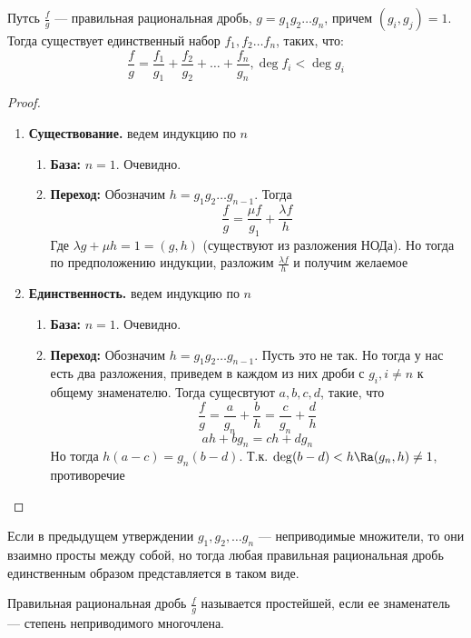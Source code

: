 \begin{theorem}
    Путсь \(\frac{f}{g}\) --- правильная рациональная дробь, \(g = g_1g_2\dots g_n\), причем \((g_i, g_j) = 1\). Тогда существует единственный набор \(f_1, f_2\dots f_n\), таких, что:
    \[\frac{f}{g} = \frac{f_1}{g_1} + \frac{f_2}{g_2} + \dots + \frac{f_n}{g_n}, \deg f_i < \deg g_i\]
\end{theorem}
\begin{proof}\indent
    \begin{enumerate}
        \item[] \textbf{Существование.} ведем индукцию по \(n\)
        \begin{enumerate}
            \item[] \textbf{База:} \(n = 1\). Очевидно.
            \item[] \textbf{Переход:} Обозначим \(h = g_1g_2\dots g_{n-1}\). Тогда 
            \[\frac{f}{g} = \frac{\mu f}{g_1} + \frac{\lambda f}{h}\]
            Где \(\lambda g + \mu h = 1 = (g, h)\) (существуют из разложения НОДа). Но тогда по предположению индукции, разложим \(\frac{\lambda f}{h}\) и получим желаемое
        \end{enumerate}
        \item[] \textbf{Единственность.} ведем индукцию по \(n\)
        \begin{enumerate}
            \item[] \textbf{База:} \(n = 1\). Очевидно.
            \item[] \textbf{Переход:} Обозначим \(h = g_1g_2\dots g_{n-1}\). Пусть это не так. Но тогда у нас есть два разложения, приведем в каждом из них дроби с \(g_i, i \ne n\) к общему знаменателю. Тогда сущесвтуют \(a, b, c, d\), такие, что
            \[\frac{f}{g} = \frac{a}{g_n} + \frac{b}{h} = \frac{c}{g_n} + \frac{d}{h}\]
            \[ah + bg_n = ch + dg_n\]
            Но тогда \(h(a - c) = g_n(b - d)\). Т.к. \(\deg(b - d) < h \Ra (g_n, h) \ne 1 \), противоречие
        \end{enumerate}
    \end{enumerate}
\end{proof}

\begin{note}
    Если в предыдущем утверждении \(g_1, g_2, \dots g_n\) --- неприводимые множители, то они взаимно просты между собой, но тогда любая правильная рациональная дробь единственным образом представляется в таком виде.
\end{note}

\begin{definition}
    Правильная рациональная дробь \(\frac{f}{g}\) называется простейшей, если ее знаменатель --- степень неприводимого многочлена.
\end{definition}

